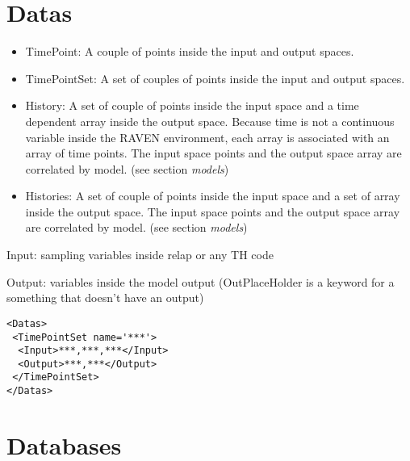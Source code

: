 \section{Datas  \\ \vspace{2 mm} {\small }}
\label{sec:Datas}

\begin{itemize}
\item TimePoint: A couple of points inside the input and output spaces. 
\item TimePointSet: A set of couples of points inside the input and output spaces.  
\item History: A set of couple of points inside the input space and a time dependent array inside the output space. Because time is not a continuous variable inside the RAVEN environment, each array is associated with an array of time points. The input space points and the output space array are correlated by model. (see section \textit{models}) 	
\item Histories: A set of couple of points inside the input space and a set of array inside the output space. The input space points and the output space array are correlated by model. (see section \textit{models})
\end{itemize}

Input: sampling variables inside relap or any TH code

Output: variables inside the model output (OutPlaceHolder is a keyword for a something that doesn't have an output)

\begin{lstlisting}[style=XML]
<Datas> 
 <TimePointSet name='***'>  
  <Input>***,***,***</Input>
  <Output>***,***</Output>
 </TimePointSet> 
</Datas>   
\end{lstlisting}







\section{Databases}

